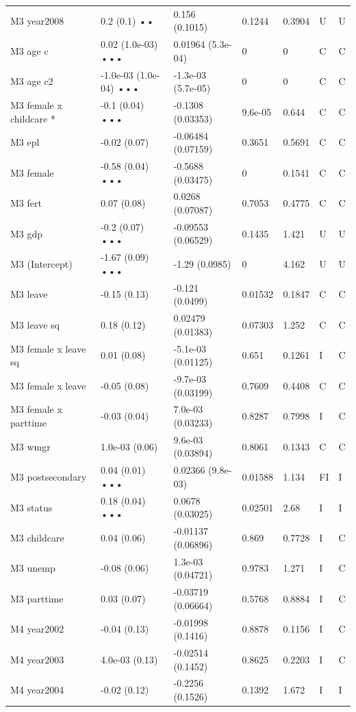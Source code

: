 {\begin{longtable}{@{}p{.245\linewidth}p{.17\linewidth}p{.17\linewidth}p{.085\linewidth}p{.060\linewidth}p{.08\linewidth}p{.07\linewidth}@{}}
M3 year2008 & 0.2 (0.1) •• & 0.156 (0.1015) & 0.1244 & 0.3904 & U & U\\
M3 age c & 0.02 (1.0e-03) ••• & 0.01964 (5.3e-04) & 0 & 0 & C & C\\
M3 age c2 & -1.0e-03 (1.0e-04) ••• & -1.3e-03 (5.7e-05) & 0 & 0 & C & C\\
M3 female x childcare * & -0.1 (0.04) ••• & -0.1308 (0.03353) & 9.6e-05 & 0.644 & C & C\\
M3 epl & -0.02 (0.07) & -0.06484 (0.07159) & 0.3651 & 0.5691 & C & C\\
M3 female & -0.58 (0.04) ••• & -0.5688 (0.03475) & 0 & 0.1541 & C & C\\
M3 fert & 0.07 (0.08) & 0.0268 (0.07087) & 0.7053 & 0.4775 & C & C\\
M3 gdp & -0.2 (0.07) ••• & -0.09553 (0.06529) & 0.1435 & 1.421 & U & U\\
M3 (Intercept) & -1.67 (0.09) ••• & -1.29 (0.0985) & 0 & 4.162 & U & U\\
M3 leave & -0.15 (0.13) & -0.121 (0.0499) & 0.01532 & 0.1847 & C & C\\
M3 leave sq & 0.18 (0.12) & 0.02479 (0.01383) & 0.07303 & 1.252 & C & C\\
M3 female x leave sq & 0.01 (0.08) & -5.1e-03 (0.01125) & 0.651 & 0.1261 & I & C\\
M3 female x leave & -0.05 (0.08) & -9.7e-03 (0.03199) & 0.7609 & 0.4408 & C & C\\
M3 female x parttime & -0.03 (0.04) & 7.0e-03 (0.03233) & 0.8287 & 0.7998 & I & C\\
M3 wmgr & 1.0e-03 (0.06) & 9.6e-03 (0.03894) & 0.8061 & 0.1343 & C & C\\
M3 postsecondary & 0.04 (0.01) ••• & 0.02366 (9.8e-03) & 0.01588 & 1.134 & FI & I\\
M3 status & 0.18 (0.04) ••• & 0.0678 (0.03025) & 0.02501 & 2.68 & I & I\\
M3 childcare & 0.04 (0.06) & -0.01137 (0.06896) & 0.869 & 0.7728 & I & C\\
M3 unemp & -0.08 (0.06) & 1.3e-03 (0.04721) & 0.9783 & 1.271 & I & C\\
M3 parttime & 0.03 (0.07) & -0.03719 (0.06664) & 0.5768 & 0.8884 & I & C\\
M4 year2002 & -0.04 (0.13) & -0.01998 (0.1416) & 0.8878 & 0.1156 & I & C\\
M4 year2003 & 4.0e-03 (0.13) & -0.02514 (0.1452) & 0.8625 & 0.2203 & I & C\\
M4 year2004 & -0.02 (0.12) & -0.2256 (0.1526) & 0.1392 & 1.672 & I & I\\

\end{longtable}}
